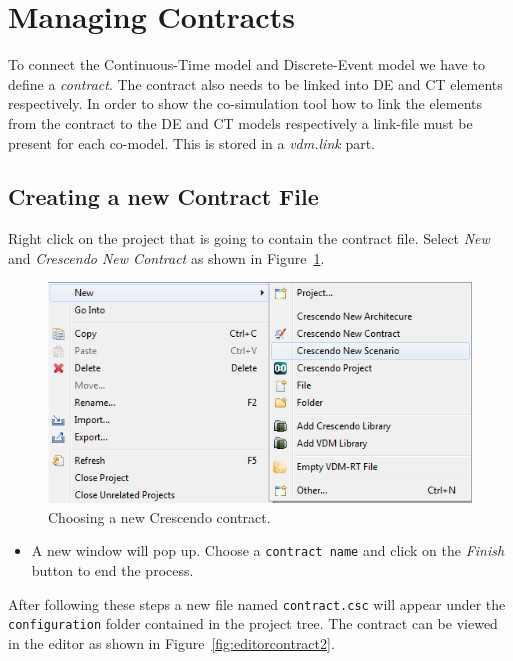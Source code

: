 \documentclass{crescendorepchap}
\begin{document}

\section{Managing Contracts}\label{sec:contract}

To connect the Continuous-Time model and Discrete-Event model 
we have to define a \emph{contract}. The contract also needs to be linked
into DE and CT elements respectively.
In order to show the co-simulation tool how to link the elements from
the contract to the DE and CT models respectively a link-file must be
present for each co-model. This is stored in a \emph{vdm.link} part.

\subsection{Creating a new Contract File}

Right click on the project that is going to contain the contract file.
Select \emph{New} and \emph{Crescendo New Contract} as shown in Figure~\ref{fig:newcontract}.

\begin{figure}[htbp]
\centering
\includegraphics[width=.6\textwidth]{images/DestecsNewContract.png}
\caption{Choosing a new Crescendo contract.\label{fig:newcontract}}
\end{figure}

\begin{itemize}
\item
  A new window will pop up. Choose a \texttt{contract name} and click on
  the \emph{Finish} button to end the process.
\end{itemize}

After following these steps a new file named \texttt{contract.csc} will
appear under the \texttt{con\-fig\-ura\-tion} folder contained in the project
tree. The contract can be viewed in the editor as shown in Figure~\ref{fig:editorcontract2}.
\end{document}
